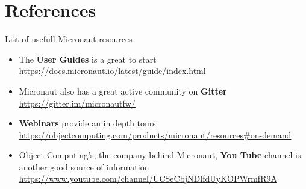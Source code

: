 \section{References}\label{sec:references}

List of usefull Micronaut resources

\begin{itemize}
  \item The \textbf{User Guides} is a great to start
  \newline
  {\footnotesize \url{https://docs.micronaut.io/latest/guide/index.html}}

  \item Micronaut also has a great active community on \textbf{Gitter}
  \newline
  {\footnotesize \url{https://gitter.im/micronautfw/}}

  \item \textbf{Webinars} provide an in depth tours
  \newline
  {\footnotesize \url{https://objectcomputing.com/products/micronaut/resources\#on-demand}}

  \item Object Computing's, the company behind Micronaut, \textbf{You Tube} channel is another good source of information
  \newline
  {\footnotesize \url{https://www.youtube.com/channel/UCSeCbjNDlfdUyKOPWrmfR9A}}
\end{itemize}